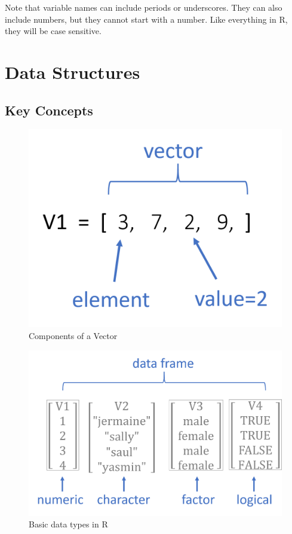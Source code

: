 \documentclass[]{book}
\theoremstyle{definition}
\theoremstyle{definition}
\theoremstyle{definition}
\theoremstyle{remark}
\begin{document}
Note that variable names can include periods or underscores. They can
also include numbers, but they cannot start with a number. Like
everything in R, they will be case sensitive.

\hypertarget{data-structures}{%
\chapter{Data Structures}\label{data-structures}}

\hypertarget{key-concepts-1}{%
\section{Key Concepts}\label{key-concepts-1}}

\begin{figure}

{\centering \includegraphics[width=0.6\linewidth]{figures/vectors} 

}

\caption{Components of a Vector}\label{fig:unnamed-chunk-40}
\end{figure}

\begin{figure}

{\centering \includegraphics[width=0.7\linewidth]{figures/data_types} 

}

\caption{Basic data types in R}\label{fig:unnamed-chunk-41}
\end{figure}
\end{document}
